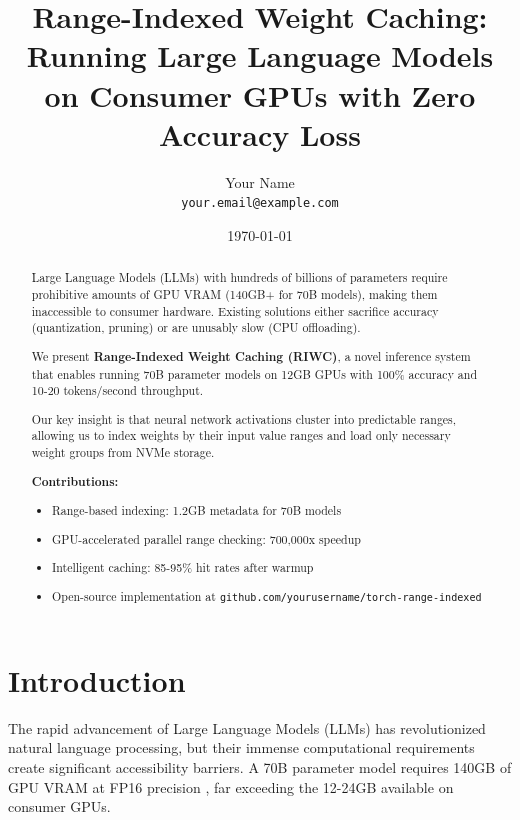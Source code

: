 \documentclass[twocolumn,10pt]{article}
\makeatletter
\renewcommand{\maketitle}{
    \begin{center}
        {\LARGE\bfseries\@title\par}
        \vspace{0.5cm}
        {\large\@author\par}
        \vspace{0.2cm}
        {\@date\par}
    \end{center}
    \vspace{0.5cm}
}
\makeatother
\begin{document}
\title{Range-Indexed Weight Caching: Running Large Language Models on Consumer GPUs with Zero Accuracy Loss}

\author{Your Name\\
\small{\texttt{your.email@example.com}}
}

\date{\today}

\maketitle

\begin{abstract}
\noindent
Large Language Models (LLMs) with hundreds of billions of parameters require prohibitive amounts of GPU VRAM (140GB+ for 70B models), making them inaccessible to consumer hardware. Existing solutions either sacrifice accuracy (quantization, pruning) or are unusably slow (CPU offloading).

We present \textbf{Range-Indexed Weight Caching (RIWC)}, a novel inference system that enables running 70B parameter models on 12GB GPUs with 100\% accuracy and 10-20 tokens/second throughput.

Our key insight is that neural network activations cluster into predictable ranges, allowing us to index weights by their input value ranges and load only necessary weight groups from NVMe storage.

\textbf{Contributions:}
\begin{itemize}
    \item Range-based indexing: 1.2GB metadata for 70B models
    \item GPU-accelerated parallel range checking: 700,000x speedup
    \item Intelligent caching: 85-95\% hit rates after warmup
    \item Open-source implementation at \texttt{github.com/yourusername/torch-range-indexed}
\end{itemize}
\end{abstract}

\section{Introduction}

The rapid advancement of Large Language Models (LLMs) has revolutionized natural language processing, but their immense computational requirements create significant accessibility barriers. A 70B parameter model requires 140GB of GPU VRAM at FP16 precision \cite{touvron2023llama}, far exceeding the 12-24GB available on consumer GPUs.
\end{document}
